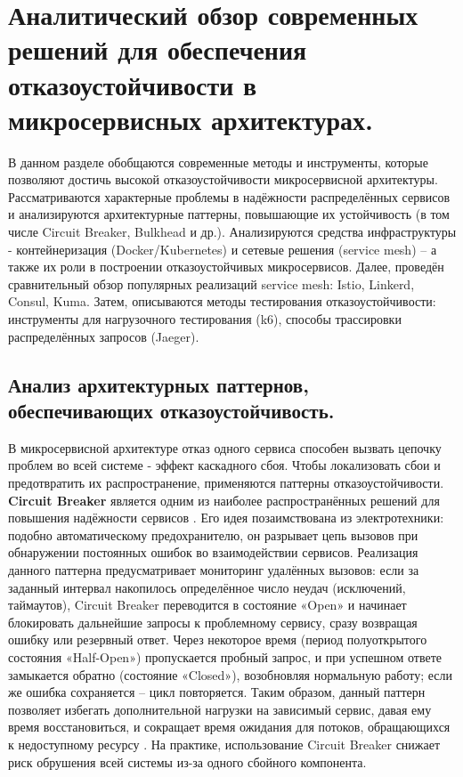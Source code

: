\chapter{Аналитический обзор современных решений для обеспечения отказоустойчивости в микросервисных архитектурах.}
\label{chapter1}





В данном разделе обобщаются современные методы и инструменты, которые позволяют достичь высокой отказоустойчивости микросервисной архитектуры.
Рассматриваются характерные проблемы в надёжности распределённых сервисов и анализируются архитектурные паттерны, повышающие их устойчивость (в том числе Circuit Breaker, Bulkhead и др.).
Анализируются средства инфраструктуры - контейнеризация (Docker/Kubernetes) и сетевые решения (service mesh) – а также их роли в построении отказоустойчивых микросервисов.
Далее, проведён сравнительный обзор популярных реализаций service mesh: Istio, Linkerd, Consul, Kuma. Затем, описываются методы тестирования отказоустойчивости: инструменты для нагрузочного тестирования (k6), способы трассировки распределённых запросов (Jaeger).

\section{Анализ архитектурных паттернов, обеспечивающих отказоустойчивость.}

В микросервисной архитектуре отказ одного сервиса способен вызвать цепочку проблем во всей системе - эффект каскадного сбоя. Чтобы локализовать сбои и предотвратить их распространение, применяются паттерны отказоустойчивости. \textbf{Circuit Breaker} является одним из наиболее распространённых решений для повышения надёжности сервисов \cite{Newman2021}. Его идея позаимствована из электротехники: подобно автоматическому предохранителю, он разрывает цепь вызовов при обнаружении постоянных ошибок во взаимодействии сервисов. Реализация данного паттерна предусматривает мониторинг удалённых вызовов: если за заданный интервал накопилось определённое число неудач (исключений, таймаутов), Circuit Breaker переводится в состояние «Open» и начинает блокировать дальнейшие запросы к проблемному сервису, сразу возвращая ошибку или резервный ответ. Через некоторое время (период полуоткрытого состояния «Half-Open») пропускается пробный запрос, и при успешном ответе замыкается обратно (состояние «Closed»), возобновляя нормальную работу; если же ошибка сохраняется – цикл повторяется. Таким образом, данный паттерн позволяет избегать дополнительной нагрузки на зависимый сервис, давая ему время восстановиться, и сокращает время ожидания для потоков, обращающихся к недоступному ресурсу \cite{Punithavathy2024}. На практике, использование Circuit Breaker снижает риск обрушения всей системы из-за одного сбойного компонента.

